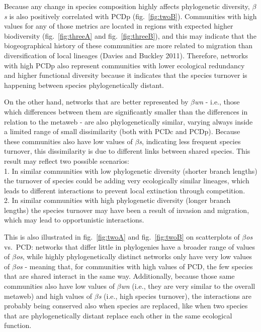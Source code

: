 \documentclass[11pt]{article}
\begin{document}
Because any change in species composition highly affects phylogenetic
diversity, \emph{\(\beta\)s} is also positively correlated with PCDp
(fig.~\ref{fig:twoB}). Communities with high values for any of those
metrics are located in regions with expected higher biodiversity
(fig.~\ref{fig:threeA} and fig.~\ref{fig:threeB}), and this may indicate
that the biogeographical history of these communities are more related
to migration than diversification of local lineages (Davies and Buckley
2011). Therefore, networks with high PCDp also represent communities
with lower ecological redundancy and higher functional diversity because
it indicates that the species turnover is happening between species
phylogenetically distant.

On the other hand, networks that are better represented by
\emph{\(\beta\)wn} - i.e., those which differences between them are
significantly smaller than the differences in relation to the metaweb -
are also phylogenetically similar, varying always inside a limited range
of small dissimilarity (both with PCDc and PCDp). Because these
communities also have low values of \emph{\(\beta\)s}, indicating less
frequent species turnover, this dissimilarity is due to different links
between shared species. This result may reflect two possible
scenarios:\\
1. In similar communities with low phylogenetic diversity (shorter
branch lengths) the turnover of species could be adding very
ecologically similar lineages, which leads to different interactions to
prevent local extinction through competition.\\
2. In similar communities with high phylogenetic diversity (longer
branch lengths) the species turnover may have been a result of invasion
and migration, which may lead to opportunistic interactions.

This is also illustrated in fig.~\ref{fig:twoA} and fig.~\ref{fig:twoB}
on scatterplots of \emph{\(\beta\)os} vs.~PCD: networks that differ
little in phylogenies have a broader range of values of
\emph{\(\beta\)os}, while highly phylogenetically distinct networks only
have very low values of \emph{\(\beta\)os} - meaning that, for
communities with high values of PCD, the few species that are shared
interact in the same way. Additionally, because those same communities
also have low values of \emph{\(\beta\)wn} (i.e., they are very similar
to the overall metaweb) and high values of \emph{\(\beta\)s} (i.e., high
species turnover), the interactions are probably being conserved also
when species are replaced, like when two species that are
phylogenetically distant replace each other in the same ecological
function.
\end{document}
